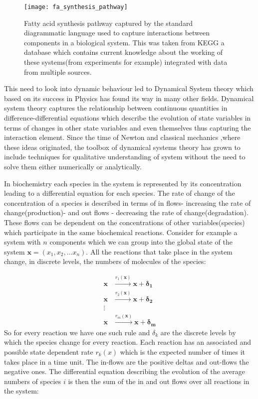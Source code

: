 \begin{figure}[htbp!]
\centering
\texttt{[image: fa\_synthesis\_pathway]}
\caption[Fatty Acid synthesis pathway]{Fatty acid synthesis pathway
  captured by the standard diagrammatic language used to capture
  interactions between components in a biological system. This was
  taken from KEGG a database which contains current knowledge about
  the working of these systems(from experiments for example)
  integrated with data from multiple sources.}
\label{fig:fa_synthesis_pathway}
\end{figure}

This need to look into dynamic behaviour led to Dynamical System
theory which based on its success in Physics has found its way in many
other fields. Dynamical system theory captures the relationship
between continuous quantities in difference-differential equations
which describe the evolution of state variables in terms of changes
in other state variables and even themselves thus capturing the
interaction element. Since the time of Newton and classical mechanics
,where these ideas originated, the toolbox of dynamical systems theory
has grown to include techniques for qualitative understanding of
system without the need to solve them either numerically or
analytically.

In biochemistry each species in the system is represented by its
concentration leading to a differential equation for each species. The
rate of change of the concentration of a species is described in terms
of in flows- increasing the rate of change(production)- and out flows
- decreasing the rate of change(degradation). These flows can be
dependent on the concentrations of other variables(species) which
participate in the same biochemical reactions. Consider for example a
system with $n$ components which we can group into the global state of
the system $\mathbf{x} = (x_1, x_2, \dots x_n)$. All the reactions
that take place in the system change, in discrete levels, the numbers
of molecules of the species:

\begin{align*}
\mathbf{x} &\overset{r_1(\mathbf{x})}{\longrightarrow} \mathbf{x} +
\mathbf{\delta_1}\\
\mathbf{x} &\overset{r_2(\mathbf{x})}{\longrightarrow} \mathbf{x} +
\mathbf{\delta_2}\\
\vdots \\
\mathbf{x} &\overset{r_m(\mathbf{x})}{\longrightarrow} \mathbf{x} +
\mathbf{\delta_m}
\end{align*}
So for every reaction we have one such rule and $\delta_k$ are the
discrete levels by which the species change for every reaction. Each
reaction has an associated and possible state dependent rate $r_k(x)$
which is the expected number of times it takes place in a time
unit. The in-flows are the positive deltas and out-flows the negative
ones. The differential equation describing the evolution of the average numbers
of  species $i$ is then the sum of the in
and out flows over all reactions in the system:

